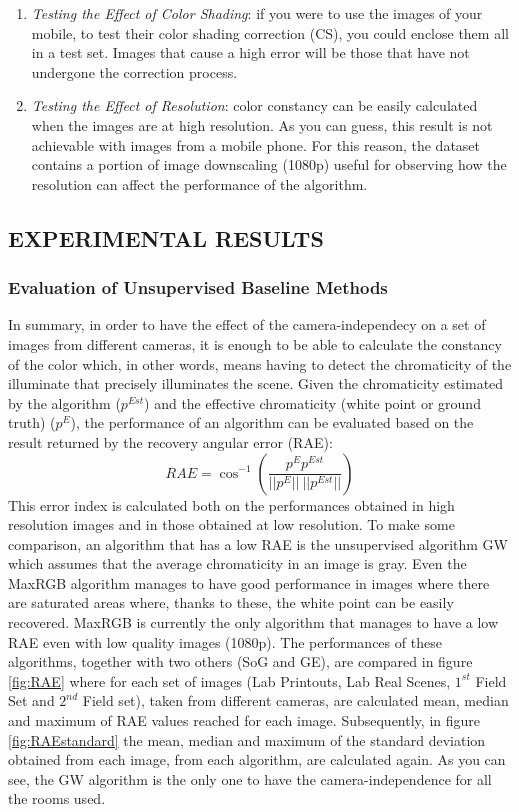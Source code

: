 \begin{enumerate}
    \item \emph{Testing the Effect of Color Shading}: if you were to use the images 
    of your mobile, to test their color shading correction (CS), you could 
    enclose them all in a test set. Images that cause a high error will be 
    those that have not undergone the correction process.
    \item \emph{Testing the Effect of Resolution}: color constancy can be easily calculated 
    when the images are at high resolution. As you can guess, this 
    result is not achievable with images from a mobile phone. For this 
    reason, the dataset contains a portion of image downscaling (1080p) 
    useful for observing how the resolution can affect the performance of 
    the algorithm.
\end{enumerate}

\subsection{EXPERIMENTAL RESULTS}
\subsubsection{Evaluation of Unsupervised Baseline Methods}
In summary, in order to have the effect of the camera-independecy on a 
set of images from different cameras, it is enough to be able to calculate 
the constancy of the color which, in other words, means having to detect the 
chromaticity of the illuminate that precisely illuminates the scene. Given the 
chromaticity estimated by the algorithm ($ p^{Est} $) and the effective chromaticity 
(white point or ground truth) ($ p^E $), the performance of an algorithm can be 
evaluated based on the result returned by the recovery angular error (RAE):
\begin{equation}
    RAE=\cos^{-1}\left(\frac{p^Ep^{Est}}{||p^E||~||p^{Est}||}\right)
\end{equation}
This error index is calculated both on the performances obtained in high 
resolution images and in those obtained at low resolution. To make some 
comparison, an algorithm that has a low RAE is the unsupervised algorithm 
GW \cite{0807099104} which assumes that the average chromaticity in an image is gray. 
Even the MaxRGB algorithm \cite{0807099103} manages to have good performance 
in images where there are saturated areas where, thanks to these, the white 
point can be easily recovered. MaxRGB is currently the only algorithm that 
manages to have a low RAE even with low quality images (1080p). The 
performances of these algorithms, together with two others (SoG and GE), 
are compared in figure \ref{fig:RAE} where for each set of images (Lab 
Printouts, Lab Real Scenes, $ 1^{st} $ Field Set and $ 2^{nd} $ Field set), taken from different cameras, 
are calculated mean, median and maximum of RAE values reached for each 
image. Subsequently, in figure \ref{fig:RAEstandard} the mean, median and maximum of the 
standard deviation obtained from each image, from each algorithm, are calculated 
again. As you can see, the GW algorithm is the only one to have the 
camera-independence for all the rooms used.

